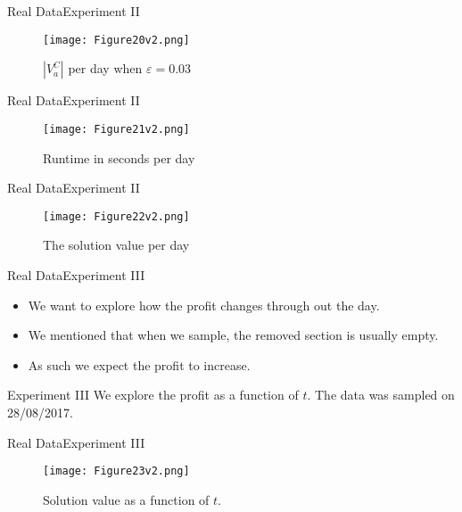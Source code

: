 \documentclass{beamer}
\begin{document}
\begin{frame}{Real Data}{Experiment II}
    \begin{figure}
        \centering
        \texttt{[image: Figure20v2.png]}
        \caption{$|V_a^C| $ per day when $\varepsilon=0.03$}
    \end{figure}
\end{frame}

\begin{frame}{Real Data}{Experiment II}
    \begin{figure}
        \centering
        \texttt{[image: Figure21v2.png]}
        \caption{Runtime in seconds per day}
    \end{figure}
\end{frame}

\begin{frame}{Real Data}{Experiment II}
    \begin{figure}
        \centering
        \texttt{[image: Figure22v2.png]}
        \caption{The solution value per day}
    \end{figure}
\end{frame}
\begin{frame}{Real Data}{Experiment III}
    \begin{itemize}
        \item {We want to explore how the profit changes through out the 
        day.}
        \item {We mentioned that when we sample, the removed section is 
        usually empty.}
        \item {As such we expect the profit to increase.}
    \end{itemize}
    \begin{block}{Experiment III}
    We explore the profit as a function of $t$. The data was sampled on 
    28/08/2017.
    \end{block}
\end{frame}

\begin{frame}{Real Data}{Experiment III}
    \begin{figure}
        \centering
        \texttt{[image: Figure23v2.png]}
        \caption{Solution value as a function of $t$.}
    \end{figure}
\end{frame}
\end{document}
